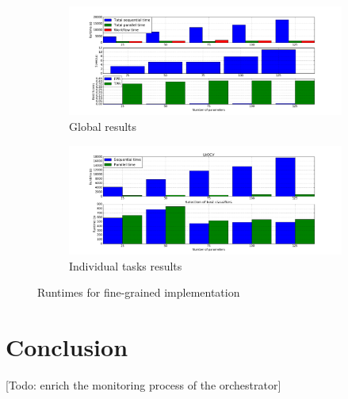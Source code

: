 \documentclass[10pt, conference, compsocconf]{IEEEtran}
\begin{document}
\begin{figure}[h]
  \begin{center}
    \begin{subfigure}{0.5\textwidth}
      \centering
      \includegraphics[width=\textwidth]{Figures/times_increasparams_global_bars.png}
      \caption{\footnotesize Global results \label{subfig:fine_glob}}
  \end{subfigure}
  \begin{subfigure}{0.5\textwidth}
    \centering
    \includegraphics[width=\textwidth]{Figures/times_increasparams_individual_bars.png}
    \caption{\footnotesize Individual tasks results \label{subfig:fine_ind}}
  \end{subfigure}
\end{center}
\caption{Runtimes for fine-grained implementation \label{fig:fine-grained}}
\end{figure}
\section{Conclusion} \label{Conclusion}

[Todo: enrich the monitoring process of the orchestrator]









\end{document}
